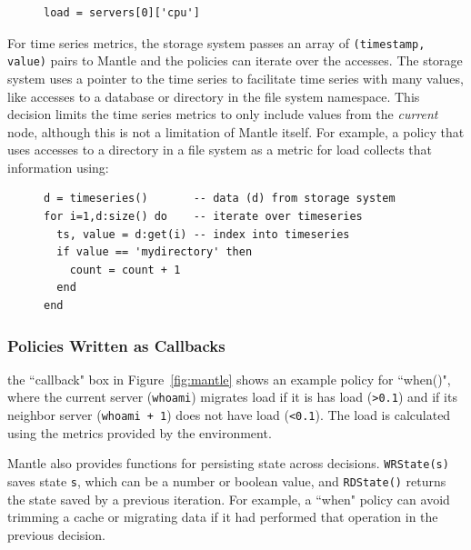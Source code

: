 \begin{figure}[h]
\footnotesize
\begin{verbatim}
load = servers[0]['cpu']
\end{verbatim}
\end{figure}

For time series metrics, the storage system passes an array of \texttt{(timestamp,
value)} pairs to Mantle and the policies can iterate over the accesses.  The
storage system uses a pointer to the time series to facilitate time series with many
values, like accesses to a database or directory in the file system namespace.
This decision limits the time series metrics to only include values from the
{\it current } node, although this is not a limitation of Mantle itself.  For
example, a policy that uses accesses to a directory in a file system as a
metric for load collects that information using:

\begin{figure}[h]
\footnotesize
\begin{verbatim}
d = timeseries()       -- data (d) from storage system
for i=1,d:size() do    -- iterate over timeseries
  ts, value = d:get(i) -- index into timeseries 
  if value == 'mydirectory' then
    count = count + 1
  end
end
\end{verbatim}
\end{figure}



\subsubsection{Policies Written as Callbacks} the ``callback" box in
Figure~\ref{fig:mantle} shows an example policy for ``when()", where the
current server (\texttt{whoami}) migrates load if it is has load
(\texttt{>0.1}) and if its neighbor server (\texttt{whoami + 1}) does not have
load (\texttt{<0.1}). The load is calculated using the metrics provided by the
environment.

Mantle also provides functions for persisting state across decisions.
\texttt{WRState(s)} saves state \texttt{s}, which can be a number or boolean
value, and \texttt{RDState()} returns the state saved by a previous iteration.
For example, a ``when" policy can avoid trimming a cache or migrating data if
it had performed that operation in the previous decision.


